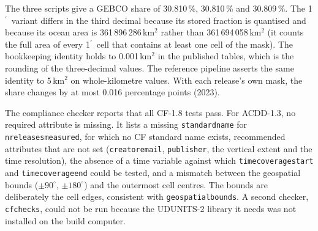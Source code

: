 \documentclass[essd, manuscript]{copernicus}
\newcommand{\am}{$^{\prime}$}            %
\renewcommand{\_}{\usorig\allowbreak}
\begin{document}
The three scripts give a GEBCO\_2026 share of 30.810\,\%, 30.810\,\% and 30.809\,\%.
The 1\am\ variant differs in the third decimal because its stored fraction is quantised and because its ocean area is 361\,896\,286\,km$^2$ rather than 361\,694\,058\,km$^2$ (it counts the full area of every 1\am\ cell that contains at least one cell of the mask).
The bookkeeping identity holds to 0.001\,km$^2$ in the published tables, which is the rounding of the three-decimal values.
The reference pipeline asserts the same identity to 5\,km$^2$ on whole-kilometre values.
With each release's own mask, the share changes by at most 0.016 percentage points (2023).

The compliance checker reports that all CF-1.8 tests pass.
For ACDD-1.3, no required attribute is missing.
It lists a missing \texttt{standard\_name} for \texttt{n\_releases\_measured}, for which no CF standard name exists, recommended attributes that are not set (\texttt{creator\_email}, \texttt{publisher\_*}, the vertical extent and the time resolution), the absence of a time variable against which \texttt{time\_coverage\_start} and \texttt{time\_coverage\_end} could be tested, and a mismatch between the geospatial bounds ($\pm 90^\circ$, $\pm 180^\circ$) and the outermost cell centres.
The bounds are deliberately the cell edges, consistent with \texttt{geospatial\_bounds}.
A second checker, \texttt{cfchecks}, could not be run because the UDUNITS-2 library it needs was not installed on the build computer.
\end{document}
